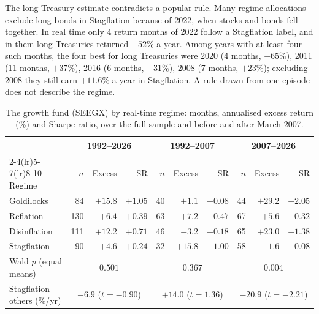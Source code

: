 \documentclass[11pt,a4paper]{article}
\begin{document}
The long-Treasury estimate contradicts a popular rule. Many regime allocations exclude long bonds in
Stagflation because of 2022, when stocks and bonds fell together. In real time only 4 return months
of 2022 follow a Stagflation label, and in them long Treasuries returned $-52\%$ a year. Among years with
at least four such months, the four best for long Treasuries were 2020 (4 months, $+65\%$), 2011 (11 months, $+37\%$), 2016 (6 months, $+31\%$), 2008 (7 months, $+23\%$); excluding 2008 they still earn
$+11.6\%$ a year in Stagflation. A rule drawn from one episode does not describe the regime.

\begin{table}[htbp]
\centering
\caption{The growth fund (SEEGX) by real-time regime: months, annualised excess return (\%) and Sharpe ratio,
over the full sample and before and after March 2007.}
\label{tab:fund}
\footnotesize
\setlength{\tabcolsep}{3.5pt}
\begin{tabular}{@{}lrrrrrrrrr@{}}
\toprule
& \multicolumn{3}{c}{1992--2026} & \multicolumn{3}{c}{1992--2007} & \multicolumn{3}{c}{2007--2026} \\
\cmidrule(lr){2-4}\cmidrule(lr){5-7}\cmidrule(lr){8-10}
Regime & $n$ & Excess & SR & $n$ & Excess & SR & $n$ & Excess & SR \\
\midrule
Goldilocks & 84 & $+15.8$ & $+1.05$ & 40 & $+1.1$ & $+0.08$ & 44 & $+29.2$ & $+2.05$ \\
Reflation & 130 & $+6.4$ & $+0.39$ & 63 & $+7.2$ & $+0.47$ & 67 & $+5.6$ & $+0.32$ \\
Disinflation & 111 & $+12.2$ & $+0.71$ & 46 & $-3.2$ & $-0.18$ & 65 & $+23.0$ & $+1.38$ \\
Stagflation & 90 & $+4.6$ & $+0.24$ & 32 & $+15.8$ & $+1.00$ & 58 & $-1.6$ & $-0.08$ \\
\midrule Wald $p$ (equal means) & \multicolumn{3}{c}{$0.501$} & \multicolumn{3}{c}{$0.367$} & \multicolumn{3}{c}{$0.004$} \\
Stagflation $-$ others (\%/yr) & \multicolumn{3}{c}{$-6.9$ ($t=-0.90$)} & \multicolumn{3}{c}{$+14.0$ ($t=1.36$)} & \multicolumn{3}{c}{$-20.9$ ($t=-2.21$)} \\
\bottomrule
\end{tabular}
\end{table}
\end{document}
